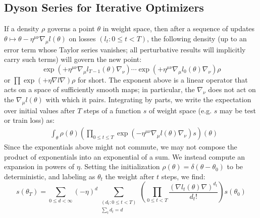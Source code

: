 \documentclass{article}
\begin{document}
\subsection{Dyson Series for Iterative Optimizers}
    If a density $\rho$ governs a point $\theta$ in weight space, then after a
    sequence of updates $\theta \mapsto \theta - \eta^{\mu\nu} \nabla_\mu
    l(\theta)$ on losses $(l_t: 0\leq t < T)$, the following density (up to an
    error term whose Taylor series vanishes; all perturbative results will
    implicitly carry such terms) will govern the new point:
    \begin{equation}\label{eq:descexp}
        \exp\left(+\eta^{\mu\nu} \nabla_\mu l_{T-1}(\theta) \nabla_\nu\right) \cdots \exp\left(+\eta^{\mu\nu} \nabla_\mu l_0(\theta) \nabla_\nu\right) \rho
    \end{equation}
    or
    $
        \prod \exp\left(+\eta \nabla l \nabla\right) \rho
    $
    for short.
    The exponent above is a linear operator that acts on a space of
    sufficiently smooth maps; in particular, the $\nabla_\nu$ does not act on
    the $\nabla_\mu l(\theta)$ with which it pairs.  Integrating by parts, we
    write the expectation over initial values after $T$ steps of a function $s$
    of weight space (e.g. $s$ may be test or train loss) as:
    \begin{align}\label{eq:contraexp}
        &\int_\theta \rho(\theta) \left(\prod_{0 \leq t \leq T} \exp\left(-\eta^{\mu\nu} \nabla_\mu l(\theta) \nabla_\nu\right) s\right)(\theta)
    \end{align}
    Since the exponentials above might not commute, we may not compose
    the product of exponentials into an exponential of a sum.  We instead
    compute an expansion in powers of $\eta$.  Setting the initialization
    $\rho(\theta) = \delta(\theta-\theta_0)$ to be deterministic, and labeling
    as $\theta_t$ the weight after $t$ steps, we find:
    \begin{equation}\label{eq:dyson}
        s(\theta_T) =
        \sum_{0\leq d < \infty} (-\eta)^d \sum_{\substack{(d_t: 0\leq t<T) \\ \sum_t d_t = d}}
        \left(\prod_{0 \leq t < T} \frac{(\nabla l_t(\theta) \nabla)^{d_t}}{d_t!}\right) s (\theta_0)
    \end{equation}
\end{document}

